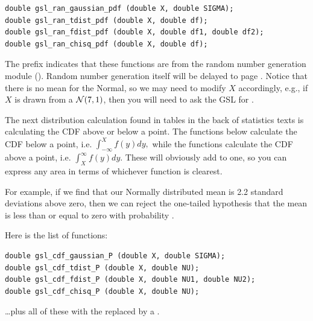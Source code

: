 \begin{lstlisting}
double gsl_ran_gaussian_pdf (double X, double SIGMA);
double gsl_ran_tdist_pdf (double X, double df);
double gsl_ran_fdist_pdf (double X, double df1, double df2);
double gsl_ran_chisq_pdf (double X, double df);
\end{lstlisting}

The prefix  indicates that these
functions are from the random number generation module
(). Random number generation itself will be
delayed to page \pageref{randomnumbers}. Notice that there is no mean
for the Normal, so we may need to modify $X$ accordingly, e.g., if $X$
is drawn from a ${\cal N}(7,1)$, then you will need to ask the GSL for 
.


The next distribution calculation found in tables in the back of
statistics texts is calculating the CDF above or below a point. 
The functions below calculate the CDF below a point, i.e.
$\int_{-\infty}^X f(y) dy,$
while the functions calculate the CDF above a point, i.e.
$\int^{\infty}_X f(y) dy.$
These will obviously add to one, so you can express any area in terms of whichever function is clearest.

For example, if we find that our Normally distributed mean is 2.2 standard
deviations above zero, then we can reject the one-tailed hypothesis that
the mean is less than or equal to zero with probability .

Here is the list of functions:
\begin{lstlisting}
double gsl_cdf_gaussian_P (double X, double SIGMA);
double gsl_cdf_tdist_P (double X, double NU);
double gsl_cdf_fdist_P (double X, double NU1, double NU2);
double gsl_cdf_chisq_P (double X, double NU);
\end{lstlisting}
\dots plus all of these with the  replaced by a .


